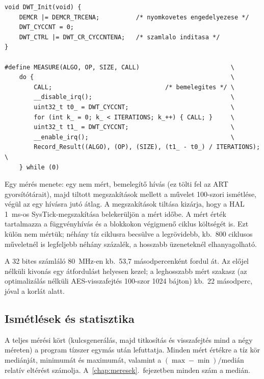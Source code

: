\documentclass[a4paper,12pt]{report}
\theoremstyle{definition}
\theoremstyle{remark}
\begin{document}
\noindent\begin{minipage}{\textwidth}
\begin{verbatim}
void DWT_Init(void) {
    DEMCR |= DEMCR_TRCENA;          /* nyomkovetes engedelyezese */
    DWT_CYCCNT = 0;
    DWT_CTRL |= DWT_CR_CYCCNTENA;   /* szamlalo inditasa */
}

#define MEASURE(ALGO, OP, SIZE, CALL)                         \
    do {                                                      \
        CALL;                               /* bemelegites */ \
        __disable_irq();                                      \
        uint32_t t0_ = DWT_CYCCNT;                            \
        for (int k_ = 0; k_ < ITERATIONS; k_++) { CALL; }     \
        uint32_t t1_ = DWT_CYCCNT;                            \
        __enable_irq();                                       \
        Record_Result((ALGO), (OP), (SIZE), (t1_ - t0_) / ITERATIONS); \
    } while (0)
\end{verbatim}
\label{lst:dwt}
\end{minipage}

\medskip

Egy mérés menete: egy nem mért, bemelegítő hívás (ez tölti fel az ART gyorsítótárait), majd tiltott megszakítások mellett a művelet 100-szori ismétlése, végül az egy hívásra jutó átlag. A megszakítások tiltása kizárja, hogy a HAL 1~ms-os SysTick-megszakítása belekerüljön a mért időbe. A mért érték tartalmazza a függvényhívás és a blokkokon végigmenő ciklus költségét is. Ezt külön nem mértük; néhány tíz ciklusra becsülve a legrövidebb, kb.\ 800 ciklusos műveletnél is legfeljebb néhány százalék, a hosszabb üzeneteknél elhanyagolható. %

A 32 bites számláló 80~MHz-en kb.\ 53,7 másodpercenként fordul át. Az előjel nélküli kivonás egy átfordulást helyesen kezel; a leghosszabb mért szakasz (az optimalizálás nélküli AES-visszafejtés 100-szor 1024 bájton) kb.\ 22 másodperc, jóval a korlát alatt.

\subsection{Ismétlések és statisztika}

A teljes mérési kört (kulcsgenerálás, majd titkosítás és visszafejtés mind a négy méreten) a program tízszer egymás után lefuttatja. Minden mért értékre a tíz kör mediánját, minimumát és maximumát, valamint a $(\max - \min)/\mathrm{medián}$ relatív eltérést számolja. A~\ref{chap:meresek}.~fejezetben minden szám a medián.
\end{document}
